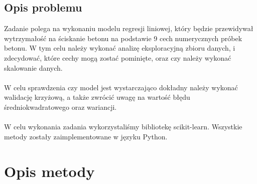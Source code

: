 \documentclass[11pt, a4paper, notitlepage]{report}
\begin{document}
\section{Opis problemu}
Zadanie polega na wykonaniu modelu regresji liniowej, który będzie przewidywał wytrzymałość na ściskanie betonu na podstawie 9 cech numerycznych próbek betonu. W tym celu należy wykonać analizę eksploracyjną zbioru danych, i zdecydować, które cechy mogą zostać pominięte, oraz czy należy wykonać skalowanie danych.
\\ \\
W celu sprawdzenia czy model jest wystarczająco dokładny należy wykonać walidację krzyżową, a także zwrócić uwagę na wartość błędu średniokwadratowego oraz wariancji.
\\ \\
W celu wykonania zadania wykorzystaliśmy bibliotekę scikit-learn. Wszystkie metody zostały zaimplementowane w języku Python.
\chapter{Opis metody}
\end{document}
